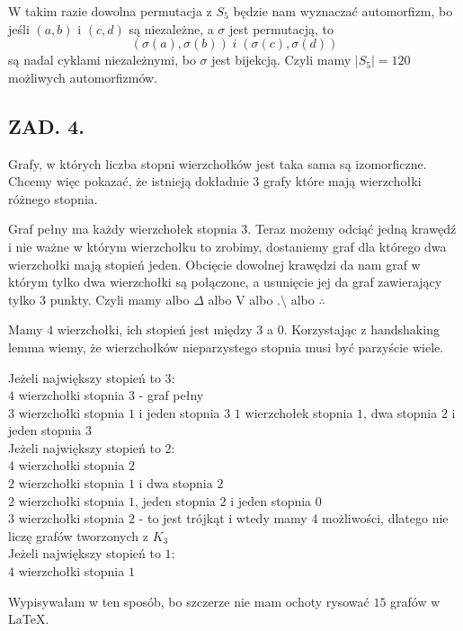 \documentclass{article}
\begin{document}
    W takim razie dowolna permutacja z $S_5$ będzie nam wyznaczać automorfizm, bo jeśli $(a,b)$ i $(c,d)$ są niezależne, a $\sigma$ jest permutacją, to
    $$(\sigma(a), \sigma(b))\;i\;(\sigma(c), \sigma(d))$$
    są nadal cyklami niezależnymi, bo $\sigma$ jest bijekcją. Czyli mamy $|S_5|=120$ możliwych automorfizmów. 

    \subsection*{ZAD. 4.}

    Grafy, w których liczba stopni wierzchołków jest taka sama są izomorficzne. Chcemy więc pokazać, że istnieją dokładnie $3$ grafy które mają wierzchołki różnego stopnia.

    Graf pełny ma każdy wierzchołek stopnia $3$. Teraz możemy odciąć jedną krawędź i nie ważne w którym wierzchołku to zrobimy, dostaniemy graf dla którego dwa wierzchołki mają stopień jeden. Obcięcie dowolnej krawędzi da nam graf w którym tylko dwa wierzchołki są połączone, a usunięcie jej da graf zawierający tylko $3$ punkty. Czyli mamy albo $\Delta$ albo V albo $.\setminus$ albo $\therefore$
    \medskip

    Mamy $4$ wierzchołki, ich stopień jest między $3$ a $0$. Korzystając z handshaking lemma wiemy, że wierzchołków nieparzystego stopnia musi być parzyście wiele.
    \smallskip

    Jeżeli największy stopień to $3$:\\
    \point $4$ wierzchołki stopnia $3$ - graf pełny\\
    \point $3$ wierzchołki stopnia $1$ i jeden stopnia $3$
    \point $1$ wierzchołek stopnia $1$, dwa stopnia $2$ i jeden stopnia $3$\smallskip\\
    Jeżeli największy stopień to $2$:\\
    \point $4$ wierzchołki stopnia $2$\\
    \point $2$ wierzchołki stopnia $1$ i dwa stopnia $2$\\
    \point $2$ wierzchołki stopnia $1$, jeden stopnia $2$ i jeden stopnia $0$\\
    \point $3$ wierzchołki stopnia $2$ - {\color{def}to jest trójkąt i wtedy mamy $4$ możliwości}, dlatego nie liczę grafów tworzonych z $K_3$\smallskip\\
    Jeżeli największy stopień to $1$:\\
    \point $4$ wierzchołki stopnia $1$
    \medskip

    Wypisywałam w ten sposób, bo szczerze nie mam ochoty rysować $15$ grafów w \LaTeX.
\end{document}
